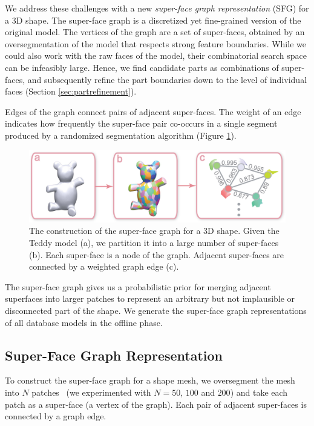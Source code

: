 We address these challenges with a new \emph{super-face graph representation} (SFG) for a 3D shape. The super-face graph is a discretized yet fine-grained version of the original model. The vertices of the graph are a set of super-faces, obtained by an oversegmentation of the model that respects strong feature boundaries. While we could also work with the raw faces of the model, their combinatorial search space can be infeasibly large. Hence, we find candidate parts as combinations of super-faces, and subsequently refine the part boundaries down to the level of individual faces (Section \ref{sec:partrefinement}).

Edges of the graph connect pairs of adjacent super-faces. The weight of an edge indicates how frequently the super-face pair co-occurs in a single segment produced by a randomized segmentation algorithm (Figure \ref{fig:SFG}).

\begin{figure}[b]\centering
\includegraphics[width=\linewidth]{./Material/SFG.pdf}
\caption{The construction of the super-face graph for a 3D shape. Given the Teddy model (a), we partition it into a large number of super-faces (b). Each super-face is a node of the graph. Adjacent super-faces are connected by a weighted graph edge (c).}\label{fig:SFG}
\end{figure}

The super-face graph gives us a probabilistic prior for merging adjacent superfaces into larger patches to represent an arbitrary but not implausible or disconnected part of the shape. We generate the super-face graph representations of all database models in the offline phase.

\subsection{Super-Face Graph Representation}\label{subsec:sfg}

To construct the super-face graph for a shape mesh, we oversegment the mesh into $N$ patches~\cite{jointshapesegmentationhuangqixingsg2011} (we experimented with $N = 50$, $100$ and $200$) and take each patch as a super-face (a vertex of the graph). Each pair of adjacent super-faces is connected by a graph edge.

